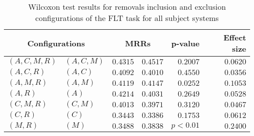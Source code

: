 
\begin{table}
\begin{spacing}{1.2}
\centering
\caption{Wilcoxon test results for removals inclusion and exclusion configurations of the FLT task for all subject systems}
\label{table:versus-wilcox-all-flt-removals}
\begin{tabular}{ll|rr|rr}
\toprule
      \multicolumn{2}{c|}{Configurations} &          \multicolumn{2}{c|}{MRRs} &       p-value & Effect size \\
\midrule
 $(A,C,M,R)$ &  $(A,C,M)$ & $0.4315$ & $0.4517$ & $0.2007$ &    $0.0620$ \\
   $(A,C,R)$ &    $(A,C)$ & $0.4092$ & $0.4010$ & $0.4550$ &    $0.0356$ \\
   $(A,M,R)$ &    $(A,M)$ & $0.4119$ & $0.4147$ & $0.0252$ &    $0.1053$ \\
     $(A,R)$ &      $(A)$ & $0.4214$ & $0.4031$ & $0.2649$ &    $0.0528$ \\
   $(C,M,R)$ &    $(C,M)$ & $0.4013$ & $0.3971$ & $0.3120$ &    $0.0467$ \\
     $(C,R)$ &      $(C)$ & $0.3443$ & $0.3386$ & $0.1753$ &    $0.0612$ \\
     $(M,R)$ &      $(M)$ & $0.3488$ & $0.3838$ & $p<0.01$ &    $0.2400$ \\
\bottomrule
\end{tabular}

\end{spacing}
\end{table}

